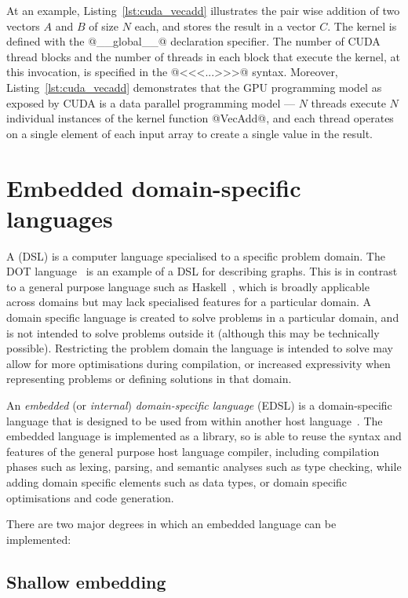 At an example, Listing~\ref{lst:cuda_vecadd} illustrates the pair wise addition
of two vectors $A$ and $B$ of size $N$ each, and stores the result in a vector
$C$. The kernel is defined with the @__global__@ declaration specifier. The
number of CUDA thread blocks and the number of threads in each block that
execute the kernel, at this invocation, is specified in the @<<<...>>>@ syntax.
Moreover, Listing~\ref{lst:cuda_vecadd} demonstrates that the GPU programming
model as exposed by CUDA is a data parallel programming model --- $N$ threads
execute $N$ individual instances of the kernel function @VecAdd@, and each
thread operates on a single element of each input array to create a single value
in the result.


\section{Embedded domain-specific languages}
\label{sec:EDSLs}

A  (DSL) is a computer language specialised to
a specific problem domain. The DOT language~\cite{Graphviz:1998ui,Ellson:2001wf}
is an example of a DSL for describing graphs. This is in contrast to a general
purpose language such as Haskell~\cite{Haskell:1998}, which is broadly
applicable across domains but may lack specialised features for a particular
domain. A domain specific language is created to solve problems in a particular
domain, and is not intended to solve problems outside it (although this may be
technically possible). Restricting the problem domain the language is intended
to solve may allow for more optimisations during compilation, or increased
expressivity when representing problems or defining solutions in that domain.

An \emph{embedded} (or \emph{internal}) \emph{domain-specific
language} (EDSL) is a domain-specific
language that is designed to be used from within another host
language~\cite{Hudak:1996}. The embedded language is implemented as a library,
so is able to reuse the syntax and features of the general purpose host language
compiler, including compilation phases such as lexing, parsing, and semantic
analyses such as type checking, while adding domain specific elements such as
data types, or domain specific optimisations and code generation.

There are two major degrees in which an embedded language can be implemented:

\subsection{Shallow embedding}

